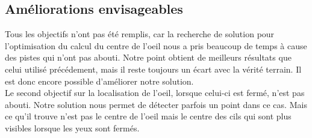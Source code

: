 \newpage

\subsection{Améliorations envisageables}
Tous les objectifs n'ont pas été remplis, car la recherche de solution pour l'optimisation du calcul du centre de l'oeil
nous a pris beaucoup de temps à cause des pistes qui n'ont pas abouti. Notre point obtient de meilleurs résultats
que celui utilisé précédement, mais il reste toujours un écart avec la vérité terrain. Il est donc encore possible
d'améliorer notre solution.\\

Le second objectif sur la localisation de l'oeil, lorsque celui-ci est fermé, n'est pas abouti. Notre solution
nous permet de détecter parfois un point dans ce cas. Mais ce qu'il trouve n'est pas le centre de l'oeil mais le
centre des cils qui sont plus visibles lorsque les yeux sont fermés.
